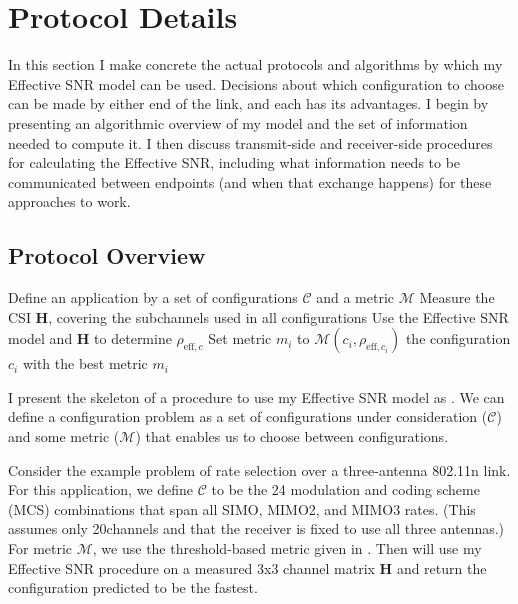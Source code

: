 \section{Protocol Details}
\label{sec:model_protocol}

In this section I make concrete the actual protocols and algorithms by which my Effective SNR model can be used. Decisions about which configuration to choose can be made by either end of the link, and each has its advantages. I begin by presenting an algorithmic overview of my model and the set of information needed to compute it. I then discuss transmit-side and receiver-side procedures for calculating the Effective SNR, including what information needs to be communicated between endpoints (and when that exchange happens) for these approaches to work.

\subsection{Protocol Overview}
\begin{algorithm}[tp]
\caption{\label{alg:eff_snr_basic}}
\begin{algorithmic}[1]
\STATE Define an application by a set of configurations $\mathcal{C}$ and a metric $\mathcal{M}$
\STATE Measure the CSI $\mathbf{H}$, covering the subchannels used in all configurations
\STATE Use the Effective SNR model and $\mathbf{H}$ to determine $\rho_{\text{eff},c}$ 
\STATE Set metric $m_i$ to $\mathcal{M}(c_i, \rho_{\text{eff},c_i})$
\ENDFOR
\RETURN the configuration $c_i$ with the best metric $m_i$
\end{algorithmic}
\end{algorithm}
I present the skeleton of a procedure to use my Effective SNR model as . We can define a configuration problem as a set of configurations under consideration ($\mathcal{C}$) and some metric ($\mathcal{M}$) that enables us to choose between configurations.

Consider the example problem of rate selection over a three-antenna 802.11n link. For this application, we define $\mathcal{C}$ to be the 24 modulation and coding scheme (MCS) combinations that span all SIMO, MIMO2, and MIMO3 rates. (This assumes only 20\MHz channels and that the receiver is fixed to use all three antennas.) For metric $\mathcal{M}$, we use the threshold-based metric given in . Then  will use my Effective SNR procedure on a measured 3x3 channel matrix $\mathbf{H}$ and return the configuration predicted to be the fastest.


